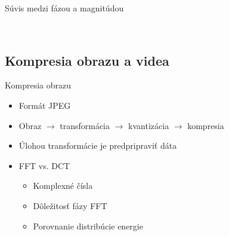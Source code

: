 \documentclass{beamer}
\def\sipka{\rightarrow}
\begin{document}
\begin{frame}{Súvis medzi fázou a magnitúdou}
\begin{figure}
\begin{centering}
        \\
        \end{centering}
    \end{figure}
\end{frame}


\subsection{Kompresia obrazu a videa}
\begin{frame}{Kompresia obrazu}
    \begin{itemize}
        \item Formát JPEG
        \item Obraz $\sipka$ transformácia $\sipka$ kvantizácia
          $\sipka$ kompresia
        \item Úlohou transformácie je predpripraviť dáta
        \item FFT vs. DCT
            \begin{itemize}
                \item Komplexné čísla
                \item Dôležitosť fázy FFT
                \item Porovnanie distribúcie energie
            \end{itemize}
    \end{itemize}
\end{frame}
\end{document}

